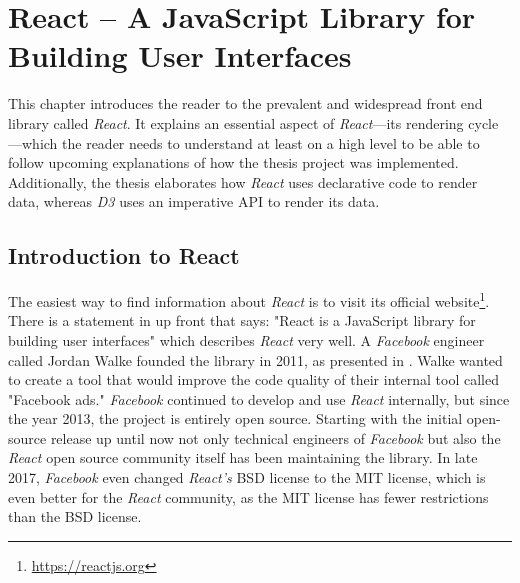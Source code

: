 \chapter{React -- A JavaScript Library for Building User Interfaces}
\label{cha:react}

This chapter introduces the reader to the prevalent and widespread front end library called \emph{React}. It explains an essential aspect of \emph{React}---its rendering cycle---which the reader needs to understand at least on a high level to be able to follow upcoming explanations of how the thesis project was implemented. Additionally, the thesis elaborates how \emph{React} uses declarative code to render data, whereas \emph{D3} uses an imperative API to render its data.

\section{Introduction to React}
\label{sec:reactIntro}

The easiest way to find information about \emph{React} is to visit its official website\footnote{\url{https://reactjs.org}}. There is a statement in \cite{React} up front that says: "React is a JavaScript library for building user interfaces" which describes \emph{React} very well. A \emph{Facebook} engineer called Jordan Walke founded the library in 2011, as presented in \cite[05:30]{ReactFoundingVideo}. Walke wanted to create a tool that would improve the code quality of their internal tool called "Facebook ads." \emph{Facebook} continued to develop and use \emph{React} internally, but since the year 2013, the project is entirely open source. Starting with the initial open-source release up until now not only technical engineers of \emph{Facebook} but also the \emph{React} open source community itself has been maintaining the library. In late 2017, \emph{Facebook} even changed \emph{React's} BSD license to the MIT license, which is even better for the \emph{React} community, as the MIT license has fewer restrictions than the BSD license.


